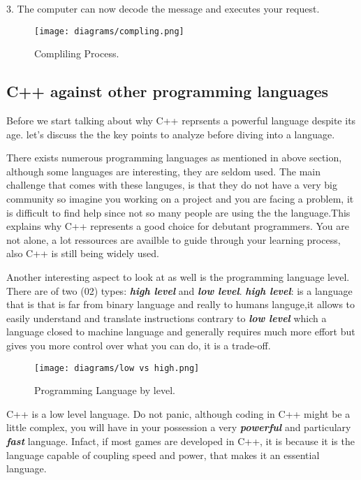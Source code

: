 \documentclass[11pt, a4paper]{article}
\begin{document}
3. The computer can now decode the message and executes your request.

\begin{figure}[!ht]
\texttt{[image: diagrams/compling.png]}
\caption{Compliling Process.}
\label{fig:Compliling Process}
\end{figure}

\subsection{C++ against other programming languages}
Before we start talking about why C++ reprsents a powerful language despite its age. let's discuss the
the key points to analyze before diving into a language.

There exists numerous programming languages as mentioned in above section, although some languages are interesting, 
they are seldom used. The main challenge that comes with these languges, is that they do not have a very big community 
so imagine you working on a project and you are facing a problem, it is difficult to find help since not so many people 
are using the the language.This explains why C++ represents a good choice for debutant programmers. You are not alone, a lot
ressources are availble to guide through your learning process, also C++ is still being widely used.

Another interesting aspect to look at as well is the programming language level. There are of two (02)
types: \textbf{\textit{{high level}}} and \textbf{\textit{{low level}}}.
\newline
\textbf{\textit{{high level}}}: is a language that is that is far from binary language and really
to humans languge,it allows to easily understand and translate instructions contrary to \textbf{\textit{{low level}}}
which a language closed to machine language and generally requires much more effort but gives you more 
control over what you can do, it is a trade-off.

\begin{figure}[h!]
    \texttt{[image: diagrams/low vs high.png]}
    \caption{Programming Language by level.}
    \label{fig:Programming Language by level}
\end{figure}
C++ is a low level language. Do not panic, although coding in C++ might be a little complex, you will 
have in your possession a very \textbf{\textit{{powerful}}} and particulary \textbf{\textit{{fast}}} language.
Infact, if most games are developed in C++, it is because it is the language capable of coupling
speed and power, that makes it an essential language.
\end{document}
